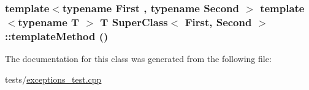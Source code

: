 \hypertarget{classSuperClass_109bd7b6ec3f8af4ede4f7e499cae3f1}{
\subsubsection[{templateMethod}]{\setlength{\rightskip}{0pt plus 5cm}template$<$typename First , typename Second $>$ template$<$typename T $>$ T {\bf SuperClass}$<$ First, Second $>$::templateMethod ()}}
\label{classSuperClass_109bd7b6ec3f8af4ede4f7e499cae3f1}




The documentation for this class was generated from the following file:\begin{CompactItemize}
\item 
tests/\hyperlink{exceptions__test_8cpp}{exceptions\_\-test.cpp}\end{CompactItemize}
